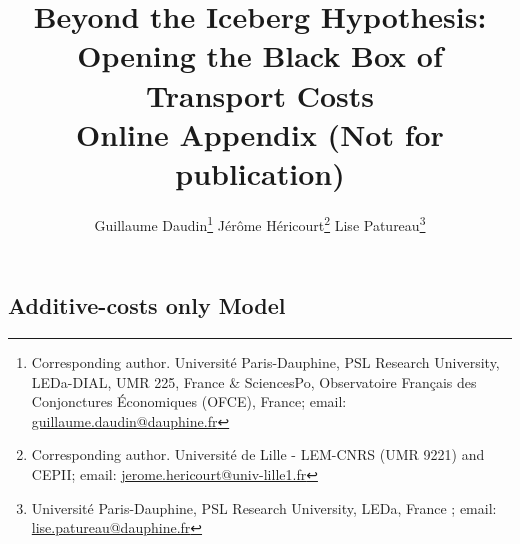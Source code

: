 \documentclass[11pt,twoside, authoryear]{elsarticle}
\begin{document}
\title{\textbf{Beyond the Iceberg Hypothesis: \\Opening the Black Box of Transport Costs}\\Online Appendix (Not for publication)}

\author{Guillaume Daudin\footnote{\noindent Corresponding author. Universit\'{e} Paris-Dauphine, PSL Research University, LEDa-DIAL, UMR 225, France \&
SciencesPo, Observatoire Français des Conjonctures \'{E}conomiques (OFCE), France; email: \url{guillaume.daudin@dauphine.fr}} \qquad \quad Jérôme Héricourt\footnote{\noindent Corresponding author. Université de Lille - LEM-CNRS (UMR 9221) and CEPII; email: \url{jerome.hericourt@univ-lille1.fr}} \qquad \quad Lise Patureau\footnote{\noindent Universit\'{e} Paris-Dauphine, PSL Research University, LEDa, France ; email: \url{lise.patureau@dauphine.fr}}}



\maketitle






\tableofcontents
\vspace{1cm}
\newpage
\listoftables

\newpage


	\renewcommand\thesubsubsection{\Alph{subsection}.\arabic{subsubsection}}
	
	\renewcommand\thesubsection{\Alph{subsection}}
	
	
\subsection{Additive-costs only Model \label{secoa:additive_only}}

\setcounter{table}{0}
\renewcommand{\thetable}{A.\arabic{table}}
\end{document}
